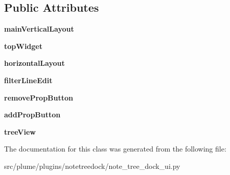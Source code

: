 \subsection*{Public Attributes}
\begin{DoxyCompactItemize}
\item 
{\bfseries main\+Vertical\+Layout}\hypertarget{classplume-creator_1_1src_1_1plume_1_1plugins_1_1notetreedock_1_1note__tree__dock__ui_1_1_ui___note_tree_dock_add77b8544d129622435ae208216b560a}{}\label{classplume-creator_1_1src_1_1plume_1_1plugins_1_1notetreedock_1_1note__tree__dock__ui_1_1_ui___note_tree_dock_add77b8544d129622435ae208216b560a}

\item 
{\bfseries top\+Widget}\hypertarget{classplume-creator_1_1src_1_1plume_1_1plugins_1_1notetreedock_1_1note__tree__dock__ui_1_1_ui___note_tree_dock_aa3f09af5d8faef57ce3e0161fb1fb406}{}\label{classplume-creator_1_1src_1_1plume_1_1plugins_1_1notetreedock_1_1note__tree__dock__ui_1_1_ui___note_tree_dock_aa3f09af5d8faef57ce3e0161fb1fb406}

\item 
{\bfseries horizontal\+Layout}\hypertarget{classplume-creator_1_1src_1_1plume_1_1plugins_1_1notetreedock_1_1note__tree__dock__ui_1_1_ui___note_tree_dock_a68817f12c14c0cd43be1e0a106da2fc7}{}\label{classplume-creator_1_1src_1_1plume_1_1plugins_1_1notetreedock_1_1note__tree__dock__ui_1_1_ui___note_tree_dock_a68817f12c14c0cd43be1e0a106da2fc7}

\item 
{\bfseries filter\+Line\+Edit}\hypertarget{classplume-creator_1_1src_1_1plume_1_1plugins_1_1notetreedock_1_1note__tree__dock__ui_1_1_ui___note_tree_dock_a961984e869254771704acda279870fb7}{}\label{classplume-creator_1_1src_1_1plume_1_1plugins_1_1notetreedock_1_1note__tree__dock__ui_1_1_ui___note_tree_dock_a961984e869254771704acda279870fb7}

\item 
{\bfseries remove\+Prop\+Button}\hypertarget{classplume-creator_1_1src_1_1plume_1_1plugins_1_1notetreedock_1_1note__tree__dock__ui_1_1_ui___note_tree_dock_a445bcc5e9c108212bb0ea88a1f8ab07a}{}\label{classplume-creator_1_1src_1_1plume_1_1plugins_1_1notetreedock_1_1note__tree__dock__ui_1_1_ui___note_tree_dock_a445bcc5e9c108212bb0ea88a1f8ab07a}

\item 
{\bfseries add\+Prop\+Button}\hypertarget{classplume-creator_1_1src_1_1plume_1_1plugins_1_1notetreedock_1_1note__tree__dock__ui_1_1_ui___note_tree_dock_a1451bdf897db1b2d8c63ba80f0ee9c3c}{}\label{classplume-creator_1_1src_1_1plume_1_1plugins_1_1notetreedock_1_1note__tree__dock__ui_1_1_ui___note_tree_dock_a1451bdf897db1b2d8c63ba80f0ee9c3c}

\item 
{\bfseries tree\+View}\hypertarget{classplume-creator_1_1src_1_1plume_1_1plugins_1_1notetreedock_1_1note__tree__dock__ui_1_1_ui___note_tree_dock_a29086866702eeaf755250bd3605da278}{}\label{classplume-creator_1_1src_1_1plume_1_1plugins_1_1notetreedock_1_1note__tree__dock__ui_1_1_ui___note_tree_dock_a29086866702eeaf755250bd3605da278}

\end{DoxyCompactItemize}


The documentation for this class was generated from the following file\+:\begin{DoxyCompactItemize}
\item 
src/plume/plugins/notetreedock/note\+\_\+tree\+\_\+dock\+\_\+ui.\+py\end{DoxyCompactItemize}
